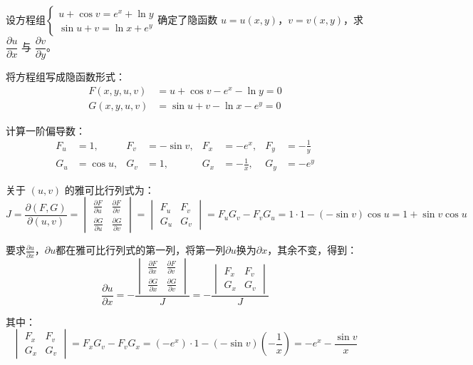 \begin{myexample}
  设方程组$\begin{cases}
u +\cos v=e^x+\ln y\\
\sin u +v=\ln x+e^y
\end{cases}$确定了隐函数 $u = u(x,y)$，$v = v(x,y)$，求 $\dfrac{\partial u}{\partial x}$ 与 $\dfrac{\partial v}{\partial y}$。

将方程组写成隐函数形式：
\[
\begin{aligned}
F(x,y,u,v) &= u + \cos v - e^x - \ln y = 0 \\
G(x,y,u,v) &= \sin u + v - \ln x - e^y = 0
\end{aligned}
\]

计算一阶偏导数：
\[
\begin{aligned}
F_u &= 1, & F_v &= -\sin v, & F_x &= -e^x, & F_y &= -\frac{1}{y}\\
G_u &= \cos u, & G_v &= 1, & G_x &= -\frac{1}{x}, & G_y &= -e^y
\end{aligned}
\]

关于 $(u,v)$ 的雅可比行列式为：
\[
J = \frac{\partial(F,G)}{\partial(u,v)} =
\begin{vmatrix}
\frac{\partial F}{\partial u} & \frac{\partial F}{\partial v} \\[6pt]
\frac{\partial G}{\partial u} & \frac{\partial G}{\partial v}
\end{vmatrix}
=
\begin{vmatrix}
F_u & F_v \\
G_u & G_v
\end{vmatrix}
= F_u G_v - F_v G_u
= 1\cdot 1 - (-\sin v)\cos u = 1 + \sin v \cos u
\]

要求$\frac{\partial u}{\partial x}$，$\partial u$都在雅可比行列式的第一列，将第一列$\partial u$换为$\partial x$，其余不变，得到：
\[
\frac{\partial u}{\partial x} = -\frac{\begin{vmatrix}
\frac{\partial F}{\partial x} & \frac{\partial F}{\partial v} \\[6pt]
\frac{\partial G}{\partial x} & \frac{\partial G}{\partial v}
\end{vmatrix}}{J} = -\frac{\begin{vmatrix}
F_x & F_v \\
G_x & G_v
\end{vmatrix}}{J}
\]

其中：
\[
\begin{vmatrix}
F_x & F_v \\
G_x & G_v
\end{vmatrix}
= F_xG_v - F_vG_x = (-e^x)\cdot 1 - (-\sin v)(-\frac{1}{x})
= -e^x - \frac{\sin v}{x}
\]


\end{myexample}
